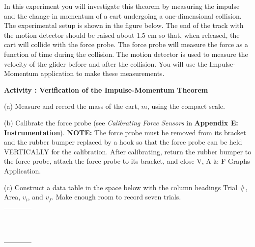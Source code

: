 In this experiment you will investigate this theorem by measuring the impulse
and the change in momentum of a cart undergoing a one-dimensional collision.
The experimental setup is shown in the figure below. The end of the track with
the motion detector should be raised about 1.5 cm so that, when released, the
cart will collide with the force probe. The force probe will measure the force
as a function of time during the collision. The motion detector is used to measure
the velocity of the glider before and after the collision. You will use the
Impulse-Momentum application to make these measurements.

\vspace{0.3cm}
{\par\centering {} \par}
\vspace{0.3cm}

\textbf{Activity  : Verification of the Impulse-Momentum Theorem} 

(a) Measure and record the mass of the cart, $m$, using the compact scale.
\vspace{10mm}

(b) Calibrate the force probe (see \textit{Calibrating Force Sensors} in \textbf{Appendix E: Instrumentation}). \textbf{NOTE:} The force probe must be removed from its bracket and the rubber bumper replaced by a hook so that the force probe can be held VERTICALLY for the calibration. After calibrating, return the rubber bumper to the force probe, attach the force probe to its bracket, and close V, A \& F Graphs Application.

(c) Construct a data table in the space below with the column headings Trial
\#, Area, \( v_{i} \), and \( v_{f} \). Make enough room to record seven trials.

\begin{center}
\begin{tabular}{|p{1.0in}|p{1.0in}|p{1.0in}|p{1.0in}|} \hline
 & & & \\ \hline
 & & & \\
 & & & \\
 & & & \\
 & & & \\
 & & & \\
 & & & \\
 & & & \\
 & & & \\
 & & & \\
 & & & \\
 & & & \\
 & & & \\
 & & & \\ \hline
\end{tabular}
\end{center}

